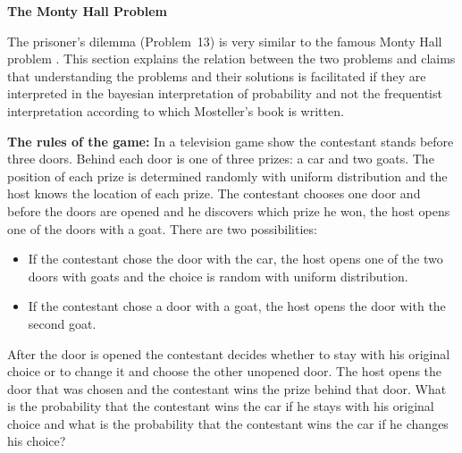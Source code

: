 

\begin{center}
\textbf{\LARGE The Monty Hall Problem}
\end{center}



The prisoner's dilemma (Problem~13) is very similar to the famous Monty Hall problem \cite{carlton,jason}. This section explains the relation between the two problems and claims that understanding the problems and their solutions is facilitated if they are interpreted in the bayesian interpretation of probability and not the frequentist interpretation according to which Mosteller's book is written.

\textbf{The rules of the game:} In a television game show the contestant stands before three doors. Behind each door is one of three prizes: a car and two goats. The position of each prize is determined randomly with uniform distribution and the host knows the location of each prize. The contestant chooses one door and before the doors are opened and he discovers which prize he won, the host opens one of the doors with a goat. There are two possibilities:
\begin{itemize}
\item If the contestant chose the door with the car, the host opens one of the two doors with goats and the choice is random with uniform distribution.
\item If the contestant chose a door with a goat, the host opens the door with the second goat. 
\end{itemize}
After the door is opened the contestant decides whether to stay with his original choice or to change it and choose the other unopened door. The host opens the door that was chosen and the contestant wins the prize behind that door.
What is the probability that the contestant wins the car if he stays with his original choice and what is the probability that the contestant wins the car if he changes his choice?

